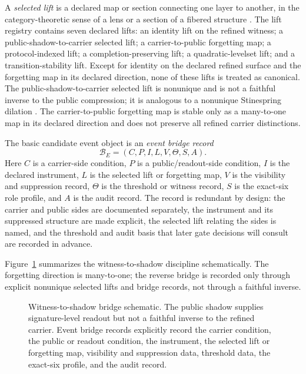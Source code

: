 \documentclass[11pt]{article}
\theoremstyle{definition}
\begin{document}
A \emph{selected lift} is a declared map or section connecting one layer to another, in the category-theoretic sense of a lens or a section of a fibered structure \citep{Spivak2019Lens,MacLaneMoerdijk1992}. The lift registry contains seven declared lifts: an identity lift on the refined witness; a public-shadow-to-carrier selected lift; a carrier-to-public forgetting map; a protocol-indexed lift; a completion-preserving lift; a quadratic-levelset lift; and a transition-stability lift. Except for identity on the declared refined surface and the forgetting map in its declared direction, none of these lifts is treated as canonical. The public-shadow-to-carrier selected lift is nonunique and is not a faithful inverse to the public compression; it is analogous to a nonunique Stinespring dilation \citep{Stinespring1955}. The carrier-to-public forgetting map is stable only as a many-to-one map in its declared direction and does not preserve all refined carrier distinctions.

The basic candidate event object is an \emph{event bridge record}
\[
  \mathcal B_E=(C,P,I,L,V,\Theta,S,A).
\]
Here \(C\) is a carrier-side condition, \(P\) is a public/readout-side condition, \(I\) is the declared instrument, \(L\) is the selected lift or forgetting map, \(V\) is the visibility and suppression record, \(\Theta\) is the threshold or witness record, \(S\) is the exact-six role profile, and \(A\) is the audit record. The record is redundant by design: the carrier and public sides are documented separately, the instrument and its suppressed structure are made explicit, the selected lift relating the sides is named, and the threshold and audit basis that later gate decisions will consult are recorded in advance.

Figure~\ref{fig:witness-public-bridge} summarizes the witness-to-shadow discipline schematically. The forgetting direction is many-to-one; the reverse bridge is recorded only through explicit nonunique selected lifts and bridge records, not through a faithful inverse.

\begin{figure}[t]
\centering
{}
\caption{Witness-to-shadow bridge schematic. The public shadow supplies signature-level readout but not a faithful inverse to the refined carrier. Event bridge records explicitly record the carrier condition, the public or readout condition, the instrument, the selected lift or forgetting map, visibility and suppression data, threshold data, the exact-six profile, and the audit record.}
\label{fig:witness-public-bridge}
\end{figure}
\end{document}
